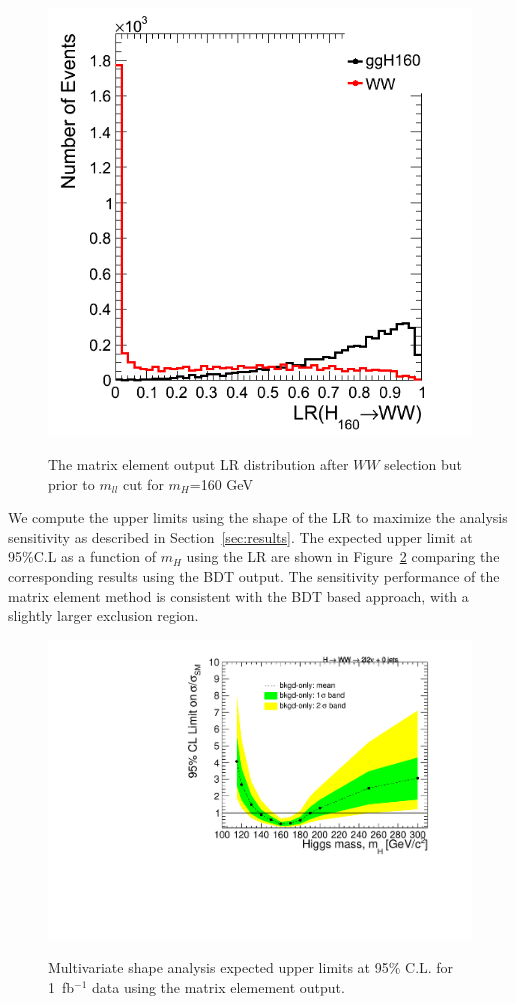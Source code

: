 \documentclass{cmspaper}
\begin{document}
\begin{figure}[!hbtp]                                                                                         
\centering                                                                                                                                             
\includegraphics[width=.42\textwidth]{figures/LR_noMll.png}\\                                            
\caption{The matrix element output LR distribution after $WW$ selection but prior to $m_{ll}$ cut                      
for $m_H$=160 GeV}
\label{fig:LR_noMll}                                                                                          
\end{figure}       


We compute the upper limits using the shape of the LR to maximize the analysis sensitivity as described in 
Section~\ref{sec:results}. The expected upper limit at 95\%C.L as a function of $m_H$ using the LR are shown in 
Figure~\ref{fig:me_expected_1fb} comparing the corresponding results using the BDT output. 
The sensitivity performance of the matrix element method is consistent with the BDT based approach, with a 
slightly larger exclusion region. 

\begin{figure}[!hbtp]
\centering
\includegraphics[width=.8\textwidth]{figures/limits_0j_1000pb_ME_shape.pdf}\\
\caption{ 
Multivariate shape analysis expected upper limits at 95$\%$ C.L. for 1~fb$^{-1}$ data using the 
matrix elemement output. } 
\label{fig:me_expected_1fb}
\end{figure}
\end{document}
